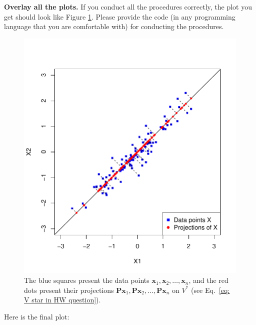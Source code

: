 \documentclass[11pt,letterpaper, leqno]{article}
\numberwithin{equation}{section}
\numberwithin{theorem}{section}
\numberwithin{lemma}{section}
\numberwithin{corollary}{section}
\numberwithin{definition}{section}
\numberwithin{proposition}{section}
\numberwithin{remark}{section}
\numberwithin{example}{section}
\begin{document}
\begin{enumerate}
\begin{enumerate}
    \end{enumerate}
    \textbf{Overlay all the plots.} If you conduct all the procedures correctly, the plot you get should look like Figure \ref{fig: pcapcapca}. Please provide the code (in any programming language that you are comfortable with) for conducting the procedures.
    \begin{figure}[h]
        \centering
        \includegraphics[scale=0.8]{pcapcapca.pdf}
        \caption{The blue squares present the data points $\boldsymbol{x}_1,\boldsymbol{x}_2,\ldots,\boldsymbol{x}_n$, and the red dots present their projections $\boldsymbol{P}\boldsymbol{x}_1, \boldsymbol{P}\boldsymbol{x}_2,\ldots, \boldsymbol{P}\boldsymbol{x}_n$ on $V^*$ (see Eq.~\eqref{eq: V star in HW question}).}
        \label{fig: pcapcapca}
    \end{figure}
\end{enumerate}
\pagebreak

    \color{blue}
        Here is the final plot: 
\end{document}
